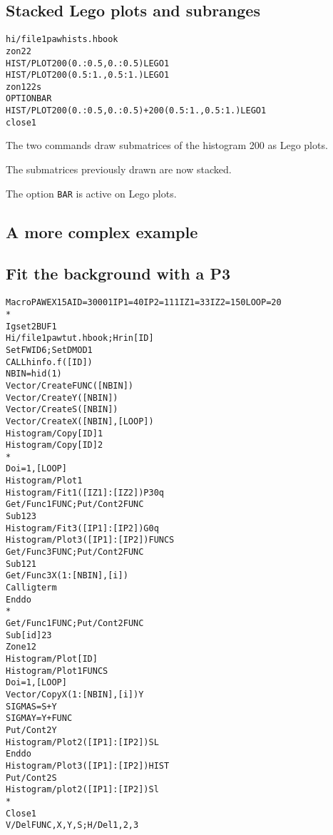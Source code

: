 \clearpage

\subsection{Stacked Lego plots and subranges}
\begin{alltt}
      hi/file 1 pawhists.hbook
      zon 2 2
     HIST/PLOT 200(0.:0.5,0.:0.5) LEGO1
     HIST/PLOT 200(0.5:1.,0.5:1.) LEGO1
      zon 1 2 2 s
     OPTION BAR
     HIST/PLOT 200(0.:0.5,0.:0.5)+200(0.5:1.,0.5:1.) LEGO1
      close 1
\end{alltt} 
\begin{DinglistE}
\item The two commands draw submatrices of the histogram 200 as Lego plots.
\item The submatrices previously drawn are now stacked. 
\item The option {\tt BAR} is active on Lego plots.
\end{DinglistE}

\clearpage

\subsection{A more complex example}
\subsection*{Fit the background with a P3}
\begin{alltt}
      Macro PAWEX15A ID=30001 IP1=40 IP2=111 IZ1=33 IZ2=150 LOOP=20
      *
      Igset 2BUF 1
      Hi/file 1 pawtut.hbook ; Hrin [ID]
      Set FWID 6 ; Set DMOD 1
     CALL hinfo.f([ID])
      NBIN = hid(1)
      Vector/Create  FUNC([NBIN])
      Vector/Create  Y([NBIN])
      Vector/Create  S([NBIN])
      Vector/Create  X([NBIN],[LOOP])
      Histogram/Copy [ID] 1
      Histogram/Copy [ID] 2
      *
     Do i=1,[LOOP]
         Histogram/Plot 1
        Histogram/Fit  1([IZ1]:[IZ2]) P3 0q
        Get/Func 1 FUNC ; Put/Cont 2 FUNC
        Sub 1 2 3
        Histogram/Fit  3([IP1]:[IP2]) G 0q
         Histogram/Plot 3([IP1]:[IP2]) FUNCS
        Get/Func 3 FUNC ; Put/Cont 2 FUNC
        Sub 1 2 1
         Get/Func 3 X(1:[NBIN],[i])
         Call igterm
      Enddo
      *
      Get/Func 1 FUNC ; Put/Cont 2 FUNC
      Sub [id] 2 3
      Zone 1 2
      Histogram/Plot [ID]
      Histogram/Plot 1 FUNCS
     Do i=1,[LOOP]
         Vector/Copy X(1:[NBIN],[i]) Y
         SIGMA S = S + Y
         SIGMA Y = Y+FUNC
         Put/Cont 2 Y
         Histogram/Plot 2([IP1]:[IP2]) SL
      Enddo
      Histogram/Plot 3([IP1]:[IP2]) HIST
      Put/Cont 2 S
      Histogram/plot 2([IP1]:[IP2]) Sl
      *
      Close 1
      V/Del FUNC,X,Y,S ; H/Del 1,2,3
\end{alltt} 
